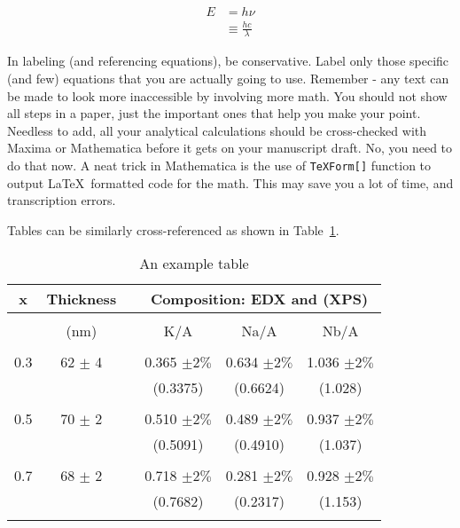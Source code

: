\documentclass[12 pt]{article}
\begin{document}
\begin{align}
  E & = h\nu \nonumber \\
  & \equiv \frac{h c}{\lambda} \label{eqn:plancksrelationship}
\end{align}

In labeling (and referencing equations), be conservative. Label only those specific (and few) equations that you are actually going to use. Remember - any text can be made to look more inaccessible by involving more math. You should not show all steps in a paper, just the important ones that help you make your point. Needless to add, all your analytical calculations should be cross-checked with Maxima or Mathematica before it gets on your manuscript draft. No, you need to do that now. A neat trick in Mathematica is the use of \verb|TeXForm[]| function to output \LaTeX\ formatted code for the math. This may save you a lot of time, and transcription errors.

Tables can be similarly cross-referenced as shown in Table~\ref{tbl:ratio}.

\begin{table}
  \caption{An example table}
  \label{tbl:ratio}
  \begin{center}
    \begin{tabular}{cccccc}
      x  & Thickness & & \multicolumn{3}{c}{Composition: EDX and (XPS)} \\
      \hline \\
         & (nm) & & K/A & Na/A & Nb/A \\
      \hline \\
      0.3 & 62 $\pm$ 4 & & 0.365 $\pm 2\%$ & 0.634 $\pm 2\%$ & 1.036 $\pm 2\%$ \\
         & & & (0.3375) & (0.6624) & (1.028) \\
      \hline \\
      0.5 & 70 $\pm$ 2 & & 0.510 $\pm 2\%$ & 0.489 $\pm 2\%$ & 0.937 $\pm 2\%$ \\
         & & & (0.5091) & (0.4910) & (1.037) \\
      \hline \\
      0.7 & 68 $\pm$ 2 & & 0.718 $\pm 2\%$ & 0.281 $\pm 2\%$ & 0.928 $\pm 2\%$ \\
         & & & (0.7682) & (0.2317) & (1.153) \\
      \hline \\
    \end{tabular}
  \end{center}
\end{table}
\end{document}
